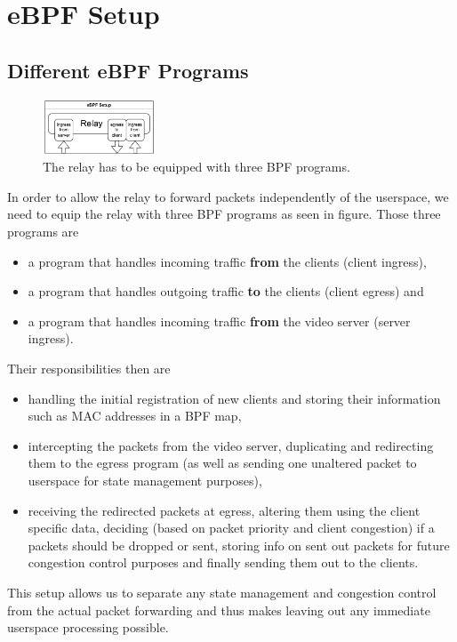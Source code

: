 \section{eBPF Setup}\label{sec:ebpf_setup}
\subsection{Different eBPF Programs}
\begin{figure}[htbp]
    \centering
    \includegraphics[width=0.3\textwidth]{figures/03_fast_relays/ebpf-setup.drawio.pdf}
    \caption[Types of eBPF programs at relay]{The relay has to be equipped with three BPF programs.}\label{fig:ebpf-programs}
\end{figure}

In order to allow the relay to forward packets independently of the userspace, we
need to equip the relay with three BPF programs as seen in figure.
Those three programs are 
\begin{itemize}
    \item a program that handles incoming traffic \textbf{from} the clients (client ingress),
    \item a program that handles outgoing traffic \textbf{to} the clients (client egress) and
    \item a program that handles incoming traffic \textbf{from} the video server (server ingress).
\end{itemize}
Their responsibilities then are
\begin{itemize}
    \item handling the initial registration of new clients and storing their information such as
    MAC addresses in a BPF map,
    \item intercepting the packets from the video server, duplicating and redirecting them to 
    the egress program (as well as sending one unaltered packet to userspace for state
    management purposes),
    \item receiving the redirected packets at egress, altering them using the client specific
    data, deciding (based on packet priority and client congestion) if a packets should be dropped 
    or sent, storing info on sent out packets for future congestion control purposes and finally sending 
    them out to the clients.
\end{itemize}
This setup allows us to separate any state management and congestion control from the actual
packet forwarding and thus makes leaving out any immediate userspace processing possible.


